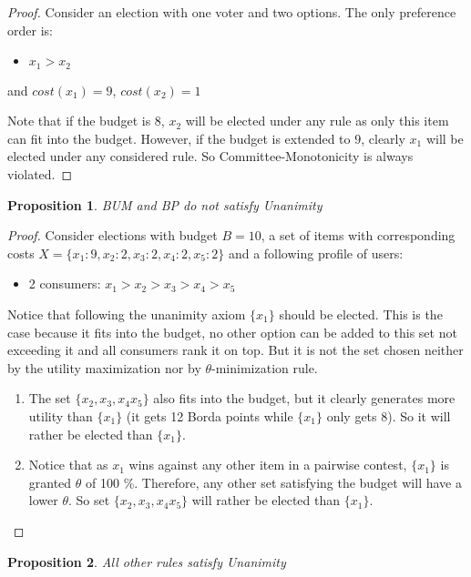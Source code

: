 \documentclass{article}
\newtheorem{mytheorem}{Proposition}
\begin{document}
\begin{proof}
Consider an election with one voter and two options. The only preference order is:
\begin{itemize}
\item $x_1 > x_2$
\end{itemize}
and $cost(x_1) = 9$, $cost(x_2)=1$

Note that if the budget is $8$, $x_2$ will be elected under any rule as only this item can fit into the budget. However, if the budget is extended to $9$, clearly $x_1$ will be elected under any considered rule. So Committee-Monotonicity is always violated.
\end{proof}
\begin{mytheorem}
BUM and BP do not satisfy Unanimity
\end{mytheorem}
\begin{proof}


Consider elections with budget $B=10$, a set of items with corresponding costs $X= \{x_1:9, x_2:2, x_3:2, x_4:2, x_5:2\}$ and a following profile of users:
\begin{itemize}
\item 2 consumers: $x_1 > x_2 >x_3 > x_4 > x_5$
\end{itemize}
 Notice that following the unanimity axiom $\{x_1 \}$ should be elected. This is the case because it fits into the budget, no other option can be added to this set not exceeding it and all consumers rank it on top. But it is not the set chosen neither by the utility maximization nor by $\theta$-minimization rule.

\begin{enumerate}
\item The set $\{x_2, x_3, x_4 x_5 \}$ also fits into the budget, but it clearly generates more utility than $\{ x_1\}$ (it gets 12 Borda points while $\{ x_1\}$ only gets 8). So it will rather be elected than $\{x_1 \}$.
\item Notice that as $x_1$ wins against any other item in a pairwise contest, $\{x_1 \}$ is granted $\theta$ of 100 \%. Therefore, any other set satisfying the budget will have a lower $\theta$. So set $\{x_2, x_3, x_4 x_5 \}$ will rather be elected than $\{x_1 \}$.
\end{enumerate}
\end{proof}
\begin{mytheorem}
All other rules satisfy Unanimity
\end{mytheorem}
\end{document}
